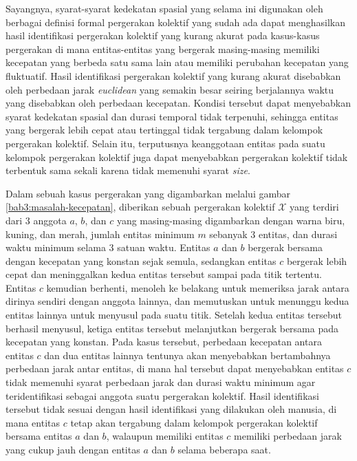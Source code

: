 Sayangnya, syarat-syarat kedekatan spasial yang selama ini digunakan oleh berbagai definisi formal pergerakan kolektif yang sudah ada dapat menghasilkan hasil identifikasi pergerakan kolektif yang kurang akurat pada kasus-kasus pergerakan di mana entitas-entitas yang bergerak masing-masing memiliki kecepatan yang berbeda satu sama lain atau memiliki perubahan kecepatan yang fluktuatif. Hasil identifikasi pergerakan kolektif yang kurang akurat disebabkan oleh perbedaan jarak \textit{euclidean} yang semakin besar seiring berjalannya waktu yang disebabkan oleh perbedaan kecepatan. Kondisi tersebut dapat menyebabkan syarat kedekatan spasial dan durasi temporal tidak terpenuhi, sehingga entitas yang bergerak lebih cepat atau tertinggal tidak tergabung dalam kelompok pergerakan kolektif. Selain itu, terputusnya keanggotaan entitas pada suatu kelompok pergerakan kolektif juga dapat menyebabkan pergerakan kolektif tidak terbentuk sama sekali karena tidak memenuhi syarat \textit{size}.
    
Dalam sebuah kasus pergerakan yang digambarkan melalui gambar \ref{bab3:masalah-kecepatan}, diberikan sebuah pergerakan kolektif $\mathcal{X}$ yang terdiri dari $3$ anggota $a$, $b$, dan $c$ yang masing-masing digambarkan dengan warna biru, kuning, dan merah, jumlah entitas minimum $m$ sebanyak $3$ entitas, dan durasi waktu minimum selama $3$ satuan waktu. Entitas $a$ dan $b$ bergerak bersama dengan kecepatan yang konstan sejak semula, sedangkan entitas $c$ bergerak lebih cepat dan meninggalkan kedua entitas tersebut sampai pada titik tertentu. Entitas $c$ kemudian berhenti, menoleh ke belakang untuk memeriksa jarak antara dirinya sendiri dengan anggota lainnya, dan memutuskan untuk menunggu kedua entitas lainnya untuk menyusul pada suatu titik. Setelah kedua entitas tersebut berhasil menyusul, ketiga entitas tersebut melanjutkan bergerak bersama pada kecepatan yang konstan. Pada kasus tersebut, perbedaan kecepatan antara entitas $c$ dan dua entitas lainnya tentunya akan menyebabkan bertambahnya perbedaan jarak antar entitas, di mana hal tersebut dapat menyebabkan entitas $c$ tidak memenuhi syarat perbedaan jarak dan durasi waktu minimum agar teridentifikasi sebagai anggota suatu pergerakan kolektif. Hasil identifikasi tersebut tidak sesuai dengan hasil identifikasi yang dilakukan oleh manusia, di mana entitas $c$ tetap akan tergabung dalam kelompok pergerakan kolektif bersama entitas $a$ dan $b$, walaupun memiliki entitas $c$ memiliki perbedaan jarak yang cukup jauh dengan entitas $a$ dan $b$ selama beberapa saat.

